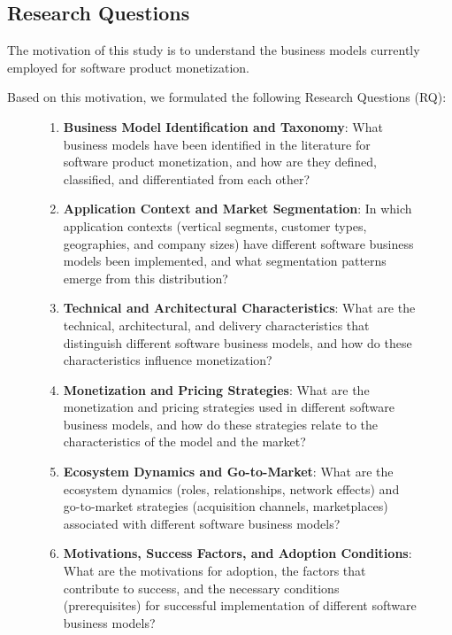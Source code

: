 \documentclass[journal]{IEEEtran}
\begin{document}
\subsection{Research Questions}\label{sec:research-questions}

The motivation of this study is to understand the business models currently employed for software product monetization.

Based on this motivation, we formulated the following Research Questions (RQ):

\begin{figure}[!htb]
    \centering
    \begin{mdframed}[roundcorner=7pt,backgroundcolor=gray!25]
    \begin{enumerate}[label=\textbf{RQ\arabic*.}]
        \small
        \item \textbf{Business Model Identification and Taxonomy}: What business models have been identified in the literature for software product monetization, and how are they defined, classified, and differentiated from each other?\label{rq:01}
        \item \textbf{Application Context and Market Segmentation}: In which application contexts (vertical segments, customer types, geographies, and company sizes) have different software business models been implemented, and what segmentation patterns emerge from this distribution?\label{rq:02}
        \item \textbf{Technical and Architectural Characteristics}: What are the technical, architectural, and delivery characteristics that distinguish different software business models, and how do these characteristics influence monetization?\label{rq:03}
        \item \textbf{Monetization and Pricing Strategies}: What are the monetization and pricing strategies used in different software business models, and how do these strategies relate to the characteristics of the model and the market?\label{rq:04}
        \item \textbf{Ecosystem Dynamics and Go-to-Market}: What are the ecosystem dynamics (roles, relationships, network effects) and go-to-market strategies (acquisition channels, marketplaces) associated with different software business models?\label{rq:05}
        \item \textbf{Motivations, Success Factors, and Adoption Conditions}: What are the motivations for adoption, the factors that contribute to success, and the necessary conditions (prerequisites) for successful implementation of different software business models?\label{rq:06}

\end{enumerate}
\end{mdframed}
\end{figure}
\end{document}
